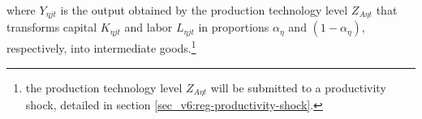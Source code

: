 \documentclass[../thesis.tex]{subfiles}
\begin{document}
\begin{comment}
	
	\begin{tcolorbox}[colback=red!5!white,colframe=red!75!black]
		“We set this parameter so that profits are zero in steady state” [Adolfson et al., 2014, p. 36] 
	\end{tcolorbox}	

\end{comment}

where $Y_{\eta jt}$ is the output obtained by the production technology level $Z_{A\eta t}$ that transforms capital $K_{\eta jt}$ and labor $L_{\eta jt}$ in proportions ${\alpha_{\eta}}$ and $(1-{\alpha_{\eta}})$, respectively, into intermediate goods.\footnote{the production technology level $Z_{A\eta t}$ will be submitted to a productivity shock, detailed in section \ref{sec_v6:reg-productivity-shock}.}

\begin{comment}
	
\subsubsection*{Lagrangian}

Transform the minimization problem with restriction into one without restriction applying the Lagrangian function $\mathcal{L}$:
\begin{align}
	\label{eq_v2:reg-int-good-firm-lagrangian}
	\mathcal{L} = (R_{Kt} K_{\eta jt} + W_t L_{\eta jt}) - \Lambda_{\eta jt} (Z_{A\eta t} K_{\eta jt}^{\alpha_{\eta}} L_{\eta jt}^{1-{\alpha_{\eta}}} - Y_{\eta jt})
\end{align}

where the Lagrangian multiplier $\Lambda_{\eta jt}$ is the marginal cost.\footnote{see Lemma \ref{lemma:marginal-cost}}

\subsubsection*{First Order Condition}

The first-order conditions are:
\begin{alignat}{2}
	K_{\eta jt}: \quad & R_{Kt} - \Lambda_{\eta jt} Z_{A\eta t} {\alpha_{\eta}} K_{\eta jt}^{{\alpha_{\eta}}-1} L_{\eta jt}^{1-{\alpha_{\eta}}} = 0 &&\implies \nonumber \\
	& K_{\eta jt} = {\alpha_{\eta}} Y_{\eta jt} \frac{\Lambda_{\eta jt}}{R_{Kt}} \label{eq_v2:reg-int-good-firm-FOC-Kt} \\
	L_{\eta jt}: \quad & W_t - \Lambda_{\eta jt} Z_{A\eta t} K_{\eta jt}^{\alpha_{\eta}} (1-{\alpha_{\eta}}) L_{\eta jt}^{-{\alpha_{\eta}}} = 0 \quad &&\implies \nonumber \\ 
	& L_{\eta jt} = (1-{\alpha_{\eta}}) Y_{\eta jt} \frac{\Lambda_{\eta jt}}{W_t} \label{eq_v2:reg-int-good-firm-FOC-Lt-0} \\
	\Lambda_{\eta jt}: \quad & Y_{\eta jt} = Z_{A\eta t} K_{\eta jt}^{\alpha_{\eta}} L_{\eta jt}^{1-{\alpha_{\eta}}} \tag{\ref{eq_v2:reg-int-good-firm-prod-function}}
\end{alignat}

\end{comment}
\end{document}

